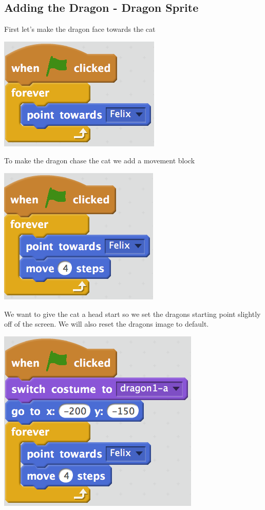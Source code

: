 \documentclass[12pt]{article}
\begin{document}
	
	
\subsection*{Adding the Dragon - Dragon Sprite}
	\begin{itemize}
		\item First let’s make the dragon face towards the cat
		\begin{center}
			\item[] \includegraphics[scale=1.0]{./Images/dragon4.png}
		\end{center}
		\newpage
		\item To make the dragon chase the cat we add a movement block
		\begin{center}
			\item[] \includegraphics[scale=1.0]{./Images/dragon5.png}
		\end{center}
		\item We want to give the cat a head start so we set the dragons starting point slightly off of the screen. We will also reset the dragons image to default.
		\begin{center}
			\item[] \includegraphics[scale=1.0]{./Images/dragon6.png}

\end{center}
\end{itemize}
\end{document}
